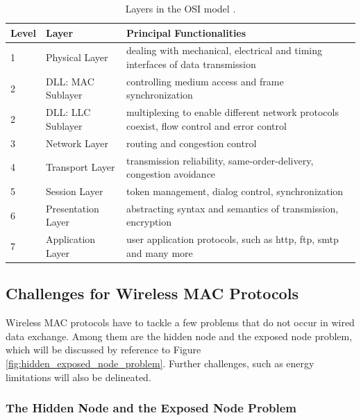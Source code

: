 \begin{table}[b]
	\begin{center}
		\begin{tabular}{|p{1cm}|p{4cm}|p{8cm}|}
			\hline
				Level & Layer & Principal Functionalities \\
			\hline
				1 & Physical Layer & dealing with mechanical, electrical and timing interfaces of data transmission  \\
				2 & DLL: MAC Sublayer & controlling medium access and frame synchronization \\
				2 & DLL: LLC Sublayer & multiplexing to enable different network protocols coexist, flow control and error control \\
				3 & Network Layer & routing and congestion control \\
				4 &Transport Layer & transmission reliability, same-order-delivery, congestion avoidance  \\
				5 & Session Layer & token management, dialog control, synchronization \\
				6 & Presentation Layer & abstracting syntax and semantics of transmission, encryption \\
				7 & Application Layer & user application protocols, such as http, ftp, smtp and many more \\
			\hline
		\end{tabular}\caption{Layers in the OSI model \cite{osi}.} \label{tab:osi-layers}
	\end{center}
\end{table}

\subsection{Challenges for Wireless MAC Protocols}

Wireless MAC protocols have to tackle a few problems that do not occur in wired data exchange. Among them are the hidden node and the exposed node problem, which will be discussed by reference to Figure \ref{fig:hidden_exposed_node_problem}. Further challenges, such as energy limitations will also be delineated.

\subsubsection{The Hidden Node and the Exposed Node Problem}


